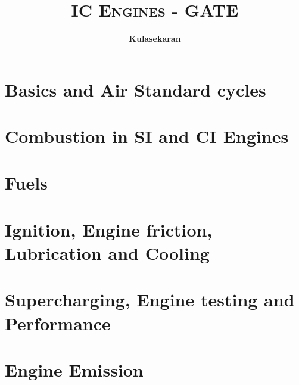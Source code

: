 \documentclass[8pt]{report}
\title{\Huge{\textsc{IC Engines - GATE}}}
\author{\huge{\textbf{Kulasekaran}}}
\begin{document}
\maketitle
\tableofcontents
\chapter{Basics and Air Standard cycles}
\chapter{Combustion in SI and CI Engines}
\chapter{Fuels}
\chapter{Ignition, Engine friction, Lubrication and Cooling}
\chapter{Supercharging, Engine testing and Performance}
\chapter{Engine Emission}
\end{document}
